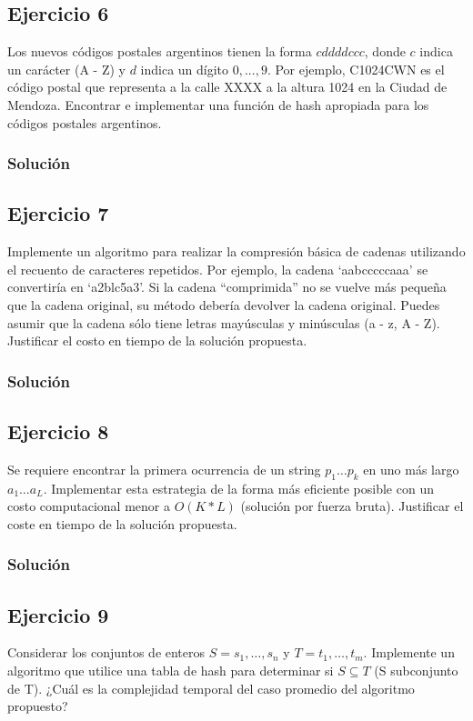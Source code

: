 \documentclass{article}
\begin{document}
\subsection*{Ejercicio 6}
Los nuevos códigos postales argentinos tienen la forma $cddddccc$, donde $c$ indica un carácter (A - Z) y $d$ indica un dígito $0, ... , 9$. Por ejemplo, C1024CWN es el código postal que representa a la calle XXXX a la altura 1024 en la Ciudad de Mendoza. Encontrar e implementar una función de hash apropiada para los códigos postales argentinos.
\subsubsection*{Solución}


\subsection*{Ejercicio 7}
Implemente un algoritmo para realizar la compresión básica de cadenas utilizando el recuento de caracteres repetidos. Por ejemplo, la cadena `aabcccccaaa' se convertiría en `a2blc5a3'. Si la cadena ``comprimida'' no se vuelve más pequeña que la cadena original, su método debería devolver la cadena original. Puedes asumir que la cadena sólo tiene letras mayúsculas y minúsculas (a - z, A - Z). Justificar el costo en tiempo de la solución propuesta.
\subsubsection*{Solución}


\subsection*{Ejercicio 8}
Se requiere encontrar la primera ocurrencia de un string $p_1 \dots p_k$ en uno más largo $a_1 \dots a_L$. Implementar esta estrategia de la forma más eficiente posible con un costo computacional menor a $O(K*L)$ (solución por fuerza bruta). Justificar el coste en tiempo de la solución propuesta.
\subsubsection*{Solución}


\subsection*{Ejercicio 9}
Considerar los conjuntos de enteros $S = {s_1, \dots , s_n}$ y $T = {t_1, \dots , t_m}$. Implemente un algoritmo que utilice una tabla de hash para determinar si $S \subseteq T$ (S subconjunto de T). ¿Cuál es la complejidad temporal del caso promedio del algoritmo propuesto?
\end{document}
